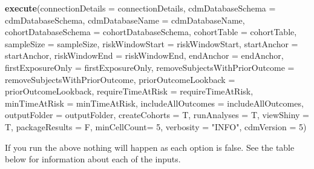 \documentclass[
]{article}
\newenvironment{Shaded}{\begin{snugshade}}{\end{snugshade}}
\newcommand{\DataTypeTok}[1]{\textcolor[rgb]{0.13,0.29,0.53}{#1}}
\newcommand{\DecValTok}[1]{\textcolor[rgb]{0.00,0.00,0.81}{#1}}
\newcommand{\KeywordTok}[1]{\textcolor[rgb]{0.13,0.29,0.53}{\textbf{#1}}}
\newcommand{\NormalTok}[1]{#1}
\newcommand{\StringTok}[1]{\textcolor[rgb]{0.31,0.60,0.02}{#1}}
\begin{document}
\begin{Shaded}
\begin{Highlighting}[]
\KeywordTok{execute}\NormalTok{(}\DataTypeTok{connectionDetails =}\NormalTok{ connectionDetails,}
                                    \DataTypeTok{cdmDatabaseSchema =}\NormalTok{ cdmDatabaseSchema,}
                                    \DataTypeTok{cdmDatabaseName =}\NormalTok{ cdmDatabaseName,}
                                    \DataTypeTok{cohortDatabaseSchema =}\NormalTok{ cohortDatabaseSchema,}
                                    \DataTypeTok{cohortTable =}\NormalTok{ cohortTable,}
                                    \DataTypeTok{sampleSize =}\NormalTok{ sampleSize,}
                                    \DataTypeTok{riskWindowStart =}\NormalTok{ riskWindowStart,}
                                    \DataTypeTok{startAnchor =}\NormalTok{ startAnchor,}
                                    \DataTypeTok{riskWindowEnd =}\NormalTok{ riskWindowEnd,}
                                    \DataTypeTok{endAnchor =}\NormalTok{ endAnchor,}
                                    \DataTypeTok{firstExposureOnly =}\NormalTok{ firstExposureOnly,}
                                    \DataTypeTok{removeSubjectsWithPriorOutcome =}\NormalTok{ removeSubjectsWithPriorOutcome,}
                                    \DataTypeTok{priorOutcomeLookback =}\NormalTok{ priorOutcomeLookback,}
                                    \DataTypeTok{requireTimeAtRisk =}\NormalTok{ requireTimeAtRisk,}
                                    \DataTypeTok{minTimeAtRisk =}\NormalTok{ minTimeAtRisk,}
                                    \DataTypeTok{includeAllOutcomes =}\NormalTok{ includeAllOutcomes,}
                                    \DataTypeTok{outputFolder =}\NormalTok{ outputFolder,}
                                    \DataTypeTok{createCohorts =}\NormalTok{ T,}
                                    \DataTypeTok{runAnalyses =}\NormalTok{ T,}
                                    \DataTypeTok{viewShiny =}\NormalTok{ T,}
                                    \DataTypeTok{packageResults =}\NormalTok{ F,}
                                    \DataTypeTok{minCellCount=} \DecValTok{5}\NormalTok{,}
                                    \DataTypeTok{verbosity =} \StringTok{"INFO"}\NormalTok{,}
                                    \DataTypeTok{cdmVersion =} \DecValTok{5}\NormalTok{)}
\end{Highlighting}
\end{Shaded}

If you run the above nothing will happen as each option is false. See
the table below for information about each of the inputs.
\end{document}
